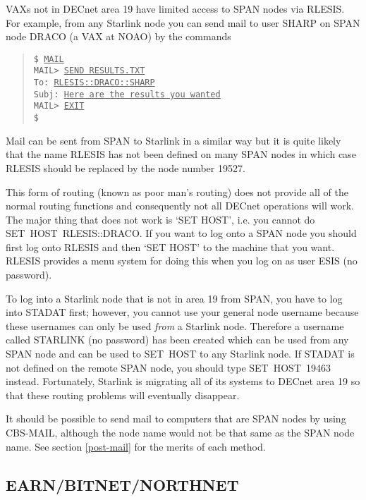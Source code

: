 VAXs not in DECnet area 19 have limited access to SPAN nodes via RLESIS. For
example, from any Starlink node you can send mail to user SHARP on SPAN node
DRACO (a VAX at NOAO) by the commands
\begin{quote}
{\tt \$ \underline{MAIL}\\[\medskipamount]
MAIL> \underline{SEND RESULTS.TXT}\\
To:     \underline{RLESIS::DRACO::SHARP}\\
Subj:   \underline{Here are the results you wanted}\\[\medskipamount]
MAIL> \underline{EXIT}\\[\medskipamount]
\$}
\end{quote}
Mail can be sent from SPAN to Starlink in a similar way but
it is quite likely that the name RLESIS has not been defined on many SPAN
nodes in which case RLESIS should be replaced by the node number 19527.

This form of routing (known as poor man's routing) does not provide all of the
normal routing functions and consequently not all DECnet operations will work.
The major thing that does not work is `SET HOST', i.e. you cannot do
SET~HOST~RLESIS::DRACO. If you want to log onto a SPAN node you should first
log onto RLESIS and then `SET HOST' to the machine that you want. RLESIS
provides a menu system for doing this when you log on as user ESIS (no
password).

To log into a Starlink node that is not in area 19 from SPAN, you have to log
into STADAT first; however, you cannot use your general node username because
these usernames can only be used {\em from} a Starlink node. Therefore a
username called STARLINK (no password) has been created which can be used from
any SPAN node and can be used to SET~HOST to any Starlink node. If STADAT is
not defined on the remote SPAN node, you should type SET~HOST~19463 instead.
Fortunately, Starlink is migrating all of its systems to DECnet area 19 so that
these routing problems will eventually disappear. 

It should be possible to send mail to computers that are SPAN nodes by using
CBS-MAIL, although the node name would not be that same as the SPAN node name.
See section \ref{post-mail} for the merits of each method.

\subsection{EARN/BITNET/NORTHNET}
\label{bitnet}

